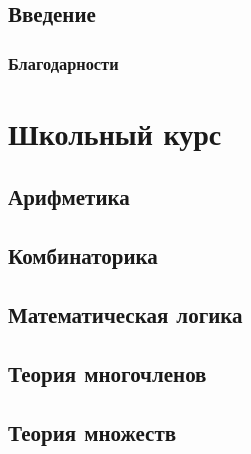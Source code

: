 \documentclass{report}
\begin{document}
\chapter*{Введение}

\section*{Благодарности}

\tableofcontents

\part{Школьный курс}
\chapter{Арифметика}

	
	
	

	
	
\chapter{Комбинаторика}

\chapter{Математическая логика}

\chapter{Теория многочленов}

	
	
\chapter{Теория множеств}




	
	
\end{document}
